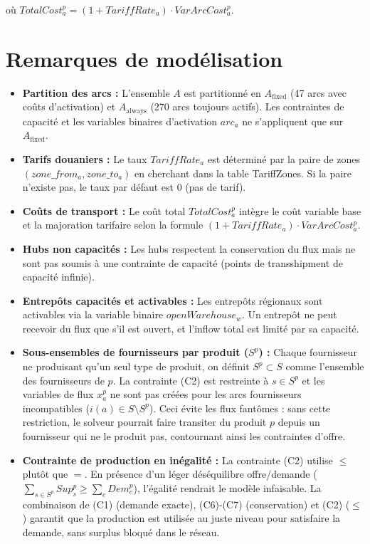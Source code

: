 \documentclass{article}
\begin{document}
\noindent où $TotalCost_a^p = (1 + TariffRate_a) \cdot VarArcCost_a^p$.

\section{Remarques de modélisation}

\begin{itemize}
    \item \textbf{Partition des arcs :} L'ensemble $A$ est partitionné en $A_{\text{fixed}}$ (47 arcs avec coûts
    d'activation) et $A_{\text{always}}$ (270 arcs toujours actifs). Les contraintes de capacité et les variables
    binaires d'activation $arc_a$ ne s'appliquent que sur $A_{\text{fixed}}$.

    \item \textbf{Tarifs douaniers :} Le taux $TariffRate_a$ est déterminé par la paire de zones
    $(zone\_from_a, zone\_to_a)$ en cherchant dans la table TariffZones. Si la paire n'existe pas,
    le taux par défaut est 0 (pas de tarif).

    \item \textbf{Coûts de transport :} Le coût total $TotalCost_a^p$ intègre le coût variable base et
    la majoration tarifaire selon la formule $(1 + TariffRate_a) \cdot VarArcCost_a^p$.

    \item \textbf{Hubs non capacités :} Les hubs respectent la conservation du flux mais ne sont pas
    soumis à une contrainte de capacité (points de transshipment de capacité infinie).

    \item \textbf{Entrepôts capacités et activables :} Les entrepôts régionaux sont activables via
    la variable binaire $openWarehouse_w$. Un entrepôt ne peut recevoir du flux que s'il est ouvert,
    et l'inflow total est limité par sa capacité.

    \item \textbf{Sous-ensembles de fournisseurs par produit ($S^p$) :}
    Chaque fournisseur ne produisant qu'un seul type de produit, on définit $S^p \subset S$
    comme l'ensemble des fournisseurs de $p$. La contrainte (C2) est restreinte à $s \in S^p$
    et les variables de flux $x_a^p$ ne sont pas créées pour les arcs fournisseurs incompatibles
    ($i(a) \in S \setminus S^p$). Ceci évite les flux fantômes : sans cette restriction,
    le solveur pourrait faire transiter du produit $p$ depuis un fournisseur qui ne le produit pas,
    contournant ainsi les contraintes d'offre.

    \item \textbf{Contrainte de production en inégalité :}
    La contrainte (C2) utilise $\le$ plutôt que $=$. En présence d'un léger déséquilibre
    offre/demande ($\sum_{s \in S^p} Sup_s^p \ge \sum_c Dem_c^p$), l'égalité rendrait
    le modèle infaisable. La combinaison de (C1) (demande exacte), (C6)-(C7) (conservation)
    et (C2) ($\le$) garantit que la production est utilisée au juste niveau pour satisfaire
    la demande, sans surplus bloqué dans le réseau.

\end{itemize}
\end{document}
